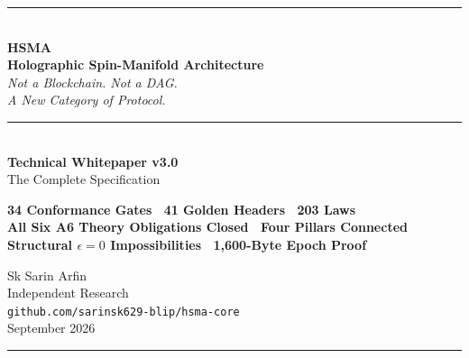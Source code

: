 \documentclass[11pt, a4paper]{article}
\begin{document}
\begin{titlepage}
\centering
\vspace*{1.5cm}
{\color{hsmaBlue}\rule{\textwidth}{2pt}}\\[0.8cm]
{\Huge\bfseries\color{hsmaDark} HSMA}\\[0.3cm]
{\LARGE\bfseries\color{hsmaBlue} Holographic Spin-Manifold Architecture}\\[0.8cm]
{\Large\itshape Not a Blockchain. Not a DAG.\\[0.2em] A New Category of Protocol.}\\[1cm]
{\color{hsmaBlue}\rule{\textwidth}{1pt}}\\[1cm]
{\large\bfseries Technical Whitepaper v3.0}\\[0.3em]
{\large The Complete Specification}\\[0.8cm]
\begin{tcolorbox}[colback=hsmaBlue!5, colframe=hsmaBlue, arc=3mm, width=14cm, center]
\centering
\textbf{34 Conformance Gates \textbullet\ 41 Golden Headers \textbullet\ 203 Laws\\
All Six A6 Theory Obligations Closed \textbullet\ Four Pillars Connected\\
Structural $\epsilon{=}0$ Impossibilities \textbullet\ 1{,}600-Byte Epoch Proof}
\end{tcolorbox}
\vfill
{\large Sk Sarin Arfin}\\[0.2em]
{\small Independent Research}\\[0.2em]
{\small \texttt{github.com/sarinsk629-blip/hsma-core}}\\[0.5em]
{\small September 2026}
\vspace*{0.5cm}
{\color{hsmaBlue}\rule{\textwidth}{2pt}}
\end{titlepage}
\end{document}
